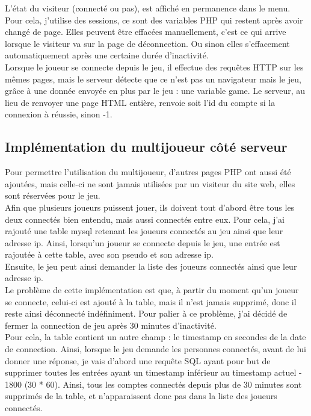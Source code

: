 \documentclass[12pt]{article}
\begin{document}
L'état du visiteur (connecté ou pas), est affiché en permanence dans le menu. Pour cela, j'utilise des sessions, ce sont des variables PHP qui restent après avoir changé de page. Elles peuvent être effacées manuellement, c'est ce qui arrive lorsque le visiteur va sur la page de déconnection. Ou sinon elles s'effacement automatiquement après une certaine durée d'inactivité.\\

Lorsque le joueur se connecte depuis le jeu, il effectue des requêtes HTTP sur les mêmes pages, mais le serveur détecte que ce n'est pas un navigateur mais le jeu, grâce à une donnée envoyée en plus par le jeu : une variable game. Le serveur, au lieu de renvoyer une page HTML entière, renvoie soit l'id du compte si la connexion à réussie, sinon -1.

\subsection{Implémentation du multijoueur côté serveur}

Pour permettre l'utilisation du multijoueur, d'autres pages PHP ont aussi été ajoutées, mais celle-ci ne sont jamais utilisées par un visiteur du site web, elles sont réservées pour le jeu.\\
Afin que plusieurs joueurs puissent jouer,  ils doivent tout d'abord être tous les deux connectés bien entendu, mais aussi connectés entre eux. Pour cela, j'ai rajouté une table mysql retenant les joueurs connectés au jeu ainsi que leur adresse ip. Ainsi, lorsqu'un joueur se connecte depuis le jeu, une entrée est rajoutée à cette table, avec son pseudo et son adresse ip.\\
Ensuite, le jeu peut ainsi demander la liste des joueurs connectés ainsi que leur adresse ip.\\
Le problème de cette implémentation est que, à partir du moment qu'un joueur se connecte, celui-ci est ajouté à la table, mais il n'est jamais supprimé, donc il reste ainsi déconnecté indéfiniment. Pour palier à ce problème, j'ai décidé de fermer la connection de jeu après 30 minutes d'inactivité.\\
Pour cela, la table contient un autre champ : le timestamp en secondes de la date de connection. Ainsi, lorsque le jeu demande les personnes connectés, avant de lui donner une réponse, je vais d'abord une requête SQL ayant pour but de supprimer toutes les entrées ayant un timestamp inférieur au timestamp actuel - 1800 (30 * 60). Ainsi, tous les comptes connectés depuis plus de 30 minutes sont supprimés de la table, et n'apparaissent donc pas dans la liste des joueurs connectés.
\end{document}
